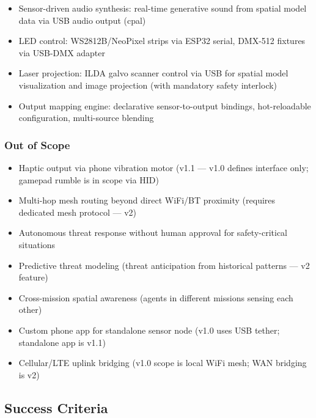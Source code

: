 \documentclass[11pt,letterpaper]{article}
\begin{document}
\begin{itemize}[leftmargin=2em]
\item Sensor-driven audio synthesis: real-time generative sound from spatial model data via USB audio output (cpal)
\item LED control: WS2812B/NeoPixel strips via ESP32 serial, DMX-512 fixtures via USB-DMX adapter
\item Laser projection: ILDA galvo scanner control via USB for spatial model visualization and image projection (with mandatory safety interlock)
\item Output mapping engine: declarative sensor-to-output bindings, hot-reloadable configuration, multi-source blending
\end{itemize}

\subsubsection{Out of Scope}

\begin{itemize}[leftmargin=2em]
\item Haptic output via phone vibration motor (v1.1 --- v1.0 defines interface only; gamepad rumble is in scope via HID)
\item Multi-hop mesh routing beyond direct WiFi/BT proximity (requires dedicated mesh protocol --- v2)
\item Autonomous threat response without human approval for safety-critical situations
\item Predictive threat modeling (threat anticipation from historical patterns --- v2 feature)
\item Cross-mission spatial awareness (agents in different missions sensing each other)
\item Custom phone app for standalone sensor node (v1.0 uses USB tether; standalone app is v1.1)
\item Cellular/LTE uplink bridging (v1.0 scope is local WiFi mesh; WAN bridging is v2)
\end{itemize}

\subsection{Success Criteria}
\end{document}
